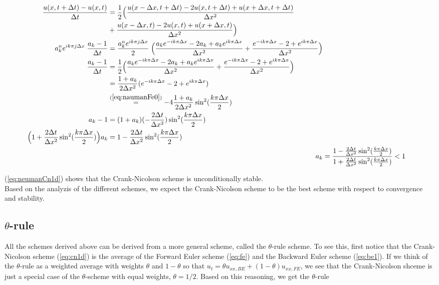 \documentclass{article}
\begin{document}
\begin{subequations}
	\begin{align}
		\begin{split}
			\frac{u(x,t+\Delta t) - u(x,t)}{\Delta t} 
			&= \frac{1}{2} \Big(\frac{u(x-\Delta x,t+ \Delta t)
			- 2u(x,t+\Delta t) +u(x+\Delta x,t+\Delta t)}{\Delta x^2} \\
			&+ \frac{u(x-\Delta x,t) - 2u(x,t) +u(x+ \Delta x,t)}{\Delta x^2} \Big) \\
			a_k^n e^{i k \pi j \Delta x}\; \frac{ a_k  - 1}{\Delta t} &= \frac{a_k^n e^{i k \pi j \Delta x}}{2}\; \Big(\frac{a_k e^{-i k \pi \Delta x} - 2a_k + a_k e^{i k \pi \Delta x}}{\Delta x^2} + \frac{e^{-i k \pi \Delta x} - 2 +  e^{i k \pi \Delta x}}{\Delta x^2} \Big)\\
			\frac{ a_k  - 1}{\Delta t}&=\frac{1}{2}\Big(\frac{a_k e^{-i k \pi \Delta x} - 2a_k + a_k e^{i k \pi \Delta x}}{\Delta x^2} + \frac{e^{-i k \pi \Delta x} - 2 +  e^{i k \pi \Delta x}}{\Delta x^2} \Big)\\
			&= \frac{1+a_k}{2\Delta x^2} (e^{-i k \pi \Delta x} - 2 + e^{i k \pi \Delta x})\\
			&\stackrel{(\ref{eq:naumanFe0})}{=} -4\frac{1+a_k}{2\Delta x^2} \sin^2(\frac{k\pi \Delta x}{2})\\
			a_k -1 &= (1 + a_k) (-\frac{2 \Delta t}{\Delta x^2})\sin^2(\frac{k\pi \Delta x}{2})\\
			\Big(1 +\frac{2 \Delta t}{\Delta x^2}\sin^2(\frac{k\pi \Delta x}{2})\Big)a_k &= 1 - \frac{2 \Delta t}{\Delta x^2}\sin^2(\frac{k\pi \Delta x}{2})
			\end{split}\\
			a_k &= \frac{1 - \frac{2 \Delta t}{\Delta x^2}\sin^2(\frac{k\pi \Delta x}{2})}{1 +\frac{2 \Delta t}{\Delta x^2}\sin^2(\frac{k\pi \Delta x}{2})} < 1\label{eq:neumanCn1d}
	\end{align}
\end{subequations}

(\ref{eq:neumanCn1d}) shows that the Crank-Nicolson scheme is unconditionally stable.\\

Based on the analyzis of the different schemes, we expect the Crank-Nicolson scheme to be the best scheme with respect to convergence and stability. 

\subsection{$\theta$-rule}
All the schemes derived above can be derived from a more general scheme, called the $\theta$-rule scheme. To see this, first notice that the Crank-Nicolson scheme (\ref{eq:cn1d}) is the average of the Forward Euler scheme (\ref{eq:fe}) and the Backward Euler scheme (\ref{eq:be1}). If we think of the $\theta$-rule as a weighted average with weights $\theta$ and $1-\theta$ so that $u_{t} = \theta u_{xx,BE} + (1- \theta) u_{xx,FE}$, we see that the Crank-Nicolson shceme is just a special case of the $\theta$-scheme with equal weights, $\theta = 1/2$. Based on this reasoning, we get the $\theta$-rule
\end{document}
